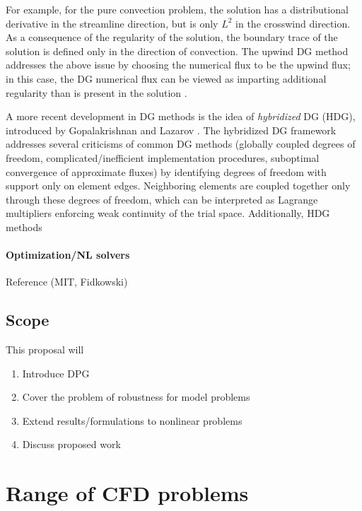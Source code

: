 \documentclass{report}
\begin{document}
For example, for the pure convection problem, the solution has a distributional derivative in the streamline direction, but is only $L^2$ in the crosswind direction. As a consequence of the regularity of the solution, the boundary trace of the solution is defined only in the direction of convection. The upwind DG method addresses the above issue by choosing the numerical flux to be the upwind flux; in this case, the DG numerical flux can be viewed as imparting additional regularity than is present in the solution \cite{DPG1,DPG3}. 



A more recent development in DG methods is the idea of \emph{hybridized} DG (HDG), introduced by Gopalakrishnan and Lazarov \cite{hybridDG}. The hybridized DG framework addresses several criticisms of common DG methods (globally coupled degrees of freedom, complicated/inefficient implementation procedures, suboptimal convergence of approximate fluxes) by identifying degrees of freedom with support only on element edges. Neighboring elements are coupled together only through these degrees of freedom, which can be interpreted as Lagrange multipliers enforcing weak continuity of the trial space. Additionally, HDG methods 

\subsubsection{Optimization/NL solvers}

Reference (MIT, Fidkowski)


\section{Scope}

This proposal will
\begin{enumerate}
\item Introduce DPG
\item Cover the problem of robustness for model problems
\item Extend results/formulations to nonlinear problems
\item Discuss proposed work
\end{enumerate}

\chapter{Range of CFD problems}
\end{document}
